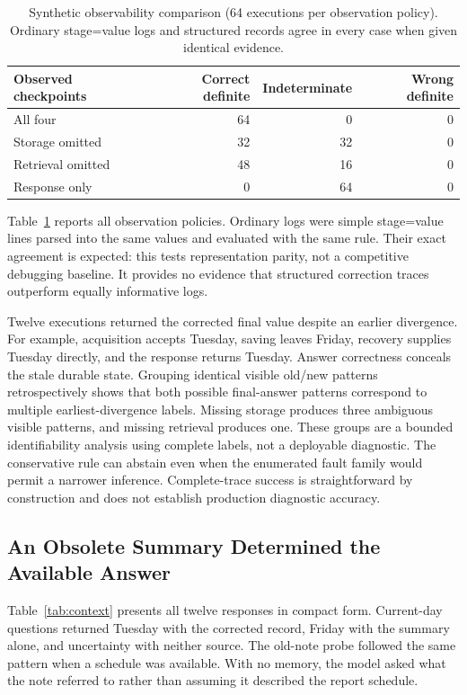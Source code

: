 \documentclass[runningheads]{llncs}
\begin{document}
\begin{table}[t]
\caption{Synthetic observability comparison (64 executions per observation policy). Ordinary stage=value logs and structured records agree in every case when given identical evidence.}\label{tab:observability}
\small
\begin{tabular}{p{4.5cm}rrr}
\toprule
Observed checkpoints & Correct definite & Indeterminate & Wrong definite \\
\midrule
All four & 64 & 0 & 0 \\
Storage omitted & 32 & 32 & 0 \\
Retrieval omitted & 48 & 16 & 0 \\
Response only & 0 & 64 & 0 \\
\bottomrule
\end{tabular}
\end{table}

Table~\ref{tab:observability} reports all observation policies. Ordinary logs were simple stage=value lines parsed into the same values and evaluated with the same rule. Their exact agreement is expected: this tests representation parity, not a competitive debugging baseline. It provides no evidence that structured correction traces outperform equally informative logs.

Twelve executions returned the corrected final value despite an earlier divergence. For example, acquisition accepts Tuesday, saving leaves Friday, recovery supplies Tuesday directly, and the response returns Tuesday. Answer correctness conceals the stale durable state. Grouping identical visible old/new patterns retrospectively shows that both possible final-answer patterns correspond to multiple earliest-divergence labels. Missing storage produces three ambiguous visible patterns, and missing retrieval produces one. These groups are a bounded identifiability analysis using complete labels, not a deployable diagnostic. The conservative rule can abstain even when the enumerated fault family would permit a narrower inference. Complete-trace success is straightforward by construction and does not establish production diagnostic accuracy.

\subsection{An Obsolete Summary Determined the Available Answer}
Table~\ref{tab:context} presents all twelve responses in compact form. Current-day questions returned Tuesday with the corrected record, Friday with the summary alone, and uncertainty with neither source. The old-note probe followed the same pattern when a schedule was available. With no memory, the model asked what the note referred to rather than assuming it described the report schedule.
\end{document}
